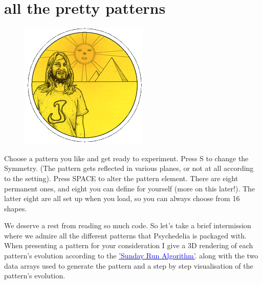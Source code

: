\chapter{all the pretty patterns} 
\label{sec:patterns}
\rhead[]{\leftmark}
\lstset{style=6502Style}
\lstset{ 
   aboveskip=5pt,
   belowskip=0pt,
}

\begin{definition}
\setlength{\intextsep}{0pt}%
\setlength{\columnsep}{3pt}%
\begin{figure}
\includegraphics[width=\linewidth]{src/callout/psych.png} 
\end{figure}
\small
Choose a pattern you like and get ready to
experiment. Press S to change the Symmetry. (The pattern gets
reflected in various planes, or not at all according to the setting).
Press SPACE to alter the pattern element. There are eight
permanent ones, and eight you can define for yourself (more on
this later!). The latter eight are all set up when you load, so you can
always choose from 16 shapes.
\end{definition}

We deserve a rest from reading so much code. So let's take a brief intermission where
we admire all the different patterns that Psychedelia is packaged with. When presenting a pattern
for your consideration I give a 3D rendering of each pattern's evolution according to the
\hyperref[sec:listing_pattern]{\textcolor{blue}{'Sunday Run Algorithm'}}.
along with the two data arrays used to generate the pattern and a step by step
visualisation of the pattern's evolution.

